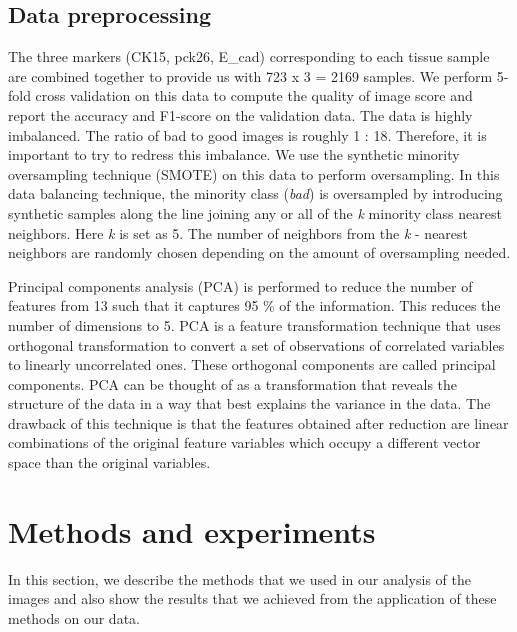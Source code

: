 \subsection{Data preprocessing}
The three markers (CK15, pck26, E\_cad) corresponding to each tissue sample are combined together to provide us with 723 x 3 = 2169 samples. We perform 5-fold cross validation on this data to compute the quality of image score and report the accuracy and F1-score on the validation data.
The data is highly imbalanced. The ratio of bad to good images is roughly 1 : 18. Therefore, it is important to try to redress this imbalance. We use the synthetic minority oversampling technique (SMOTE) \cite{chawla2002smote} on this data to perform oversampling.  In this data balancing technique, the minority class (\textit{bad}) is oversampled by introducing synthetic samples along the line joining any or all of the \textit{k} minority class nearest neighbors. Here \textit{k} is set as 5. The number of neighbors from the \textit{k} - nearest neighbors are randomly chosen depending on the amount of oversampling needed.

Principal components analysis (PCA) \cite{wold1987principal} is performed to reduce the number of features from 13 such that it captures 95 \% of the information. This reduces the number of dimensions to 5.
PCA is a feature transformation technique that uses orthogonal transformation to convert a set of observations of correlated variables to linearly uncorrelated ones. These orthogonal components are called principal components. PCA can be thought of as a transformation that reveals the structure of the data in a way that best explains the variance in the data. The drawback of this technique is that the features obtained after reduction are linear combinations of the original feature variables which occupy a different vector space than the original variables. 


\section{Methods and experiments}
In this section, we describe the methods that we used in our analysis of the images and also show the results that we achieved from the application of these methods on our data.

